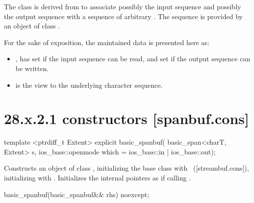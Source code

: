 \documentclass[ebook,11pt,article]{memoir}
\renewcommand{\iref}[1]{[#1]}
\begin{document}
\pnum
The class
is derived from
to associate possibly the input sequence and possibly
the output sequence with a sequence of arbitrary
.
The sequence is provided by an object of class
.

\pnum
For the sake of exposition, the maintained data is presented here as:
\begin{itemize}
\item
{},
has
set if the input sequence can be read, and
set if the output sequence can be written.
\item
{}
is the view to the underlying character sequence.
\end{itemize}

\section{28.x.2.1  constructors [spanbuf.cons]}

%
\begin{itemdecl}
template <ptrdiff_t Extent>
explicit basic_spanbuf(
  basic_span<charT, Extent> s,
  ios_base::openmode which = ios_base::in | ios_base::out);
\end{itemdecl}

\begin{itemdescr}
\pnum
\effects
Constructs an object of class
,
initializing the base class with
~(\iref{streambuf.cons}), initializing
with . 
Initializes the internal pointers as if calling .
\end{itemdescr}

%
\begin{itemdecl}
basic_spanbuf(basic_spanbuf&& rhs) noexcept;
\end{itemdecl}
\end{document}
